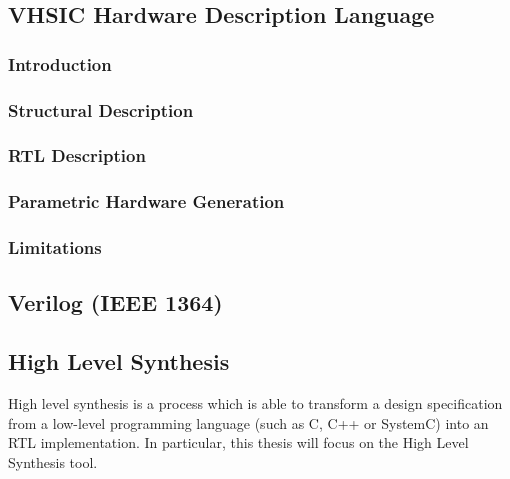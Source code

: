 \subsection{VHSIC Hardware Description Language}
\label{vhdl}

\subsubsection{Introduction}
\label{vhdl:introduction}

\subsubsection{Structural Description}
\label{vhdl:structuralDescription}

\subsubsection{RTL Description}
\label{vhdl:rtlDescription}

\subsubsection{Parametric Hardware Generation}
\label{vhdl:parametricHardwareGeneration}

\subsubsection{Limitations}
\label{vhdl:limitations}

\subsection{Verilog (IEEE 1364)}
\label{verilog}

\subsection{High Level Synthesis}
\label{hls}
High level synthesis is a process which is able to transform a design
specification from a low-level programming language (such as C, C++ or SystemC)
into an \gls{RTL} implementation. In particular, this thesis will focus on the
 High Level Synthesis tool.

